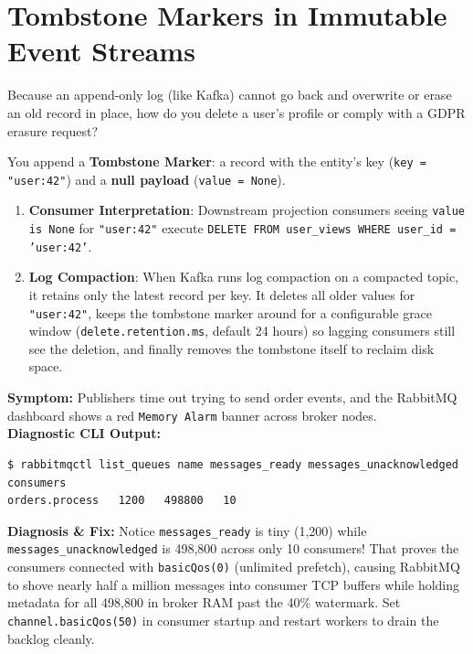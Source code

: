 \section{Tombstone Markers in Immutable Event Streams}

Because an append-only log (like Kafka) cannot go back and overwrite or erase an old record in place, how do you delete a user's profile or comply with a GDPR erasure request?

You append a \textbf{Tombstone Marker}: a record with the entity's key (\texttt{key = "user:42"}) and a \textbf{null payload} (\texttt{value = None}).
\begin{enumerate}[leftmargin=18pt]
  \item \textbf{Consumer Interpretation}: Downstream projection consumers seeing \texttt{value is None} for \texttt{"user:42"} execute \texttt{DELETE FROM user\_views WHERE user\_id = 'user:42'}.
  \item \textbf{Log Compaction}: When Kafka runs log compaction on a compacted topic, it retains only the latest record per key. It deletes all older values for \texttt{"user:42"}, keeps the tombstone marker around for a configurable grace window (\texttt{delete.retention.ms}, default 24 hours) so lagging consumers still see the deletion, and finally removes the tombstone itself to reclaim disk space.
\end{enumerate}

\begin{realworldbox}
\textbf{Symptom:} Publishers time out trying to send order events, and the RabbitMQ dashboard shows a red \texttt{Memory Alarm} banner across broker nodes.\\
\textbf{Diagnostic CLI Output:}
\begin{verbatim}
$ rabbitmqctl list_queues name messages_ready messages_unacknowledged consumers
orders.process   1200   498800   10
\end{verbatim}
\textbf{Diagnosis \& Fix:} Notice \texttt{messages\_ready} is tiny (1,200) while \texttt{messages\_unacknowledged} is 498,800 across only 10 consumers! That proves the consumers connected with \texttt{basicQos(0)} (unlimited prefetch), causing RabbitMQ to shove nearly half a million messages into consumer TCP buffers while holding metadata for all 498,800 in broker RAM past the 40\% watermark. Set \texttt{channel.basicQos(50)} in consumer startup and restart workers to drain the backlog cleanly.
\end{realworldbox}

